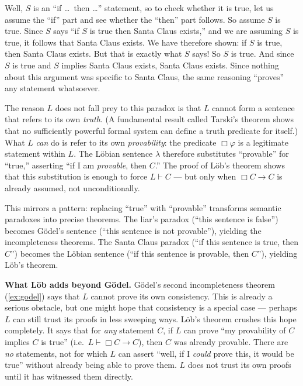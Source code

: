 \documentclass[11pt]{article}
\begin{document}
\begin{exercise}
\begin{enumerate}
\begin{remark}
\medskip
\noindent
Well, $S$ is an ``if \ldots\ then \ldots'' statement, so to check whether it is true,
let us assume the ``if'' part and see whether the ``then'' part follows. So assume $S$
is true. Since $S$ says ``if $S$ is true then Santa Claus exists,'' and we are
assuming $S$ is true, it follows that Santa Claus exists. We have therefore shown: if
$S$ is true, then Santa Claus exists. But that is exactly what $S$ says! So $S$ is
true. And since $S$ is true and $S$ implies Santa Claus exists, Santa Claus exists.
Since nothing about this argument was specific to Santa Claus, the same reasoning
``proves'' any statement whatsoever.

\medskip
\noindent
The reason $L$ does not fall prey to this paradox is that $L$ cannot form a sentence
that refers to its own \emph{truth}. (A fundamental result called Tarski's theorem
shows that no sufficiently powerful formal system can define a truth predicate for
itself.) What $L$ \emph{can} do is refer to its own \emph{provability}: the predicate
$\Box\varphi$ is a legitimate statement within $L$. The L\"obian sentence $\lambda$
therefore substitutes ``provable'' for ``true,'' asserting ``if I am \emph{provable},
then $C$.'' The proof of L\"ob's theorem shows that this substitution is enough to
force $L \vdash C$ --- but only when $\Box C \to C$ is already assumed, not
unconditionally.

\medskip
\noindent
This mirrors a pattern: replacing ``true'' with ``provable'' transforms semantic
paradoxes into precise theorems. The liar's paradox (``this sentence is false'')
becomes G\"odel's sentence (``this sentence is not provable''), yielding the
incompleteness theorems. The Santa Claus paradox (``if this sentence is true, then
$C$'') becomes the L\"obian sentence (``if this sentence is provable, then $C$''),
yielding L\"ob's theorem.

\medskip
\noindent
\textbf{What L\"ob adds beyond G\"odel.} G\"odel's second incompleteness theorem
(\cref{ex:godel}) says that $L$ cannot prove its own consistency. This is already a
serious obstacle, but one might hope that consistency is a special case --- perhaps
$L$ can still trust its proofs in less sweeping ways. L\"ob's theorem crushes this
hope completely. It says that for \emph{any} statement $C$, if $L$ can prove ``my
provability of $C$ implies $C$ is true'' (i.e.\ $L \vdash \Box C \to C$), then $C$
was already provable. There are \emph{no} statements, not for which $L$ can assert ``well, if I \emph{could} prove this, it would be
true'' without already being able to prove them. $L$ does not trust its own proofs
until it has witnessed them directly.


\end{remark}
\end{enumerate}
\end{exercise}
\end{document}
